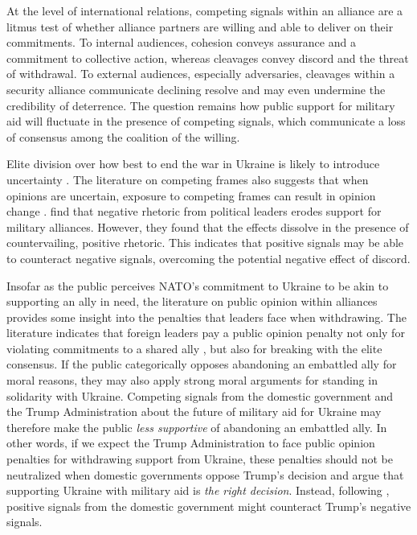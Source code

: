 At the level of international relations, competing signals within an alliance are a litmus test of whether alliance partners are willing and able to deliver on their commitments. To internal audiences, cohesion conveys assurance and a commitment to collective action, whereas cleavages convey discord and the threat of withdrawal.\autocite{jakob_barrett_how_2026} To external audiences, especially adversaries, cleavages within a security alliance communicate declining resolve and may even undermine the credibility of deterrence. The question remains how public support for military aid will fluctuate in the presence of competing signals, which communicate a loss of consensus among the coalition of the willing.  

Elite division over how best to end the war in Ukraine is likely to introduce uncertainty \autocite{berinsky_assuming_2007, scott_public_2015}. The literature on competing frames also suggests that when opinions are uncertain, exposure to competing frames can result in opinion change \autocite{matthes_diachronic_2012}. \textcite{chu_commanding_2021} find that negative rhetoric from political leaders erodes support for military alliances. However, they found that the effects dissolve in the presence of countervailing, positive rhetoric. This indicates that positive signals may be able to counteract negative signals, overcoming the potential negative effect of discord. 

Insofar as the public perceives NATO's commitment to Ukraine to be akin to supporting an ally in need, the literature on public opinion within alliances provides some insight into the penalties that leaders face when withdrawing. 
The literature indicates that foreign leaders pay a public opinion penalty not only for violating commitments to a shared ally \autocite{tomz&weeks2021, chiba_careful_2015}, but also for breaking with the elite consensus. \autocite{chu_commanding_2021, reiter_manipulating_2024} If the public categorically opposes abandoning an embattled ally for moral reasons, they may also apply strong moral arguments for standing in solidarity with Ukraine. Competing signals from the domestic government and the Trump Administration about the future of military aid for Ukraine may therefore make the public \emph{less supportive} of abandoning an embattled ally. In other words, if we expect the Trump Administration to face public opinion penalties for withdrawing support from Ukraine, these penalties should not be neutralized when domestic governments oppose Trump's decision and argue that supporting Ukraine with military aid is \emph{the right decision}. Instead, following \textcite{chu_commanding_2021}, positive signals from the domestic government might counteract Trump's negative signals. 

